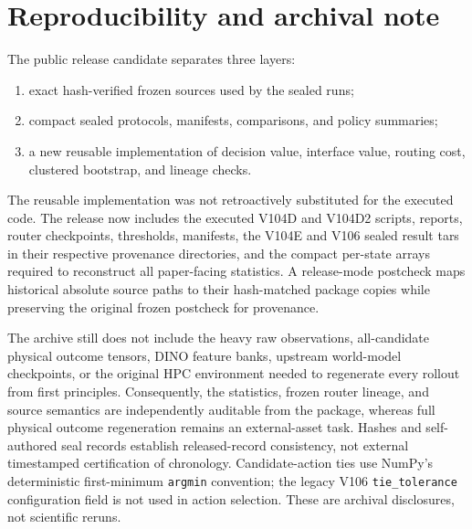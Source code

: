 \documentclass[10pt]{article}
\theoremstyle{definition}
\theoremstyle{remark}
\begin{document}
\section{Reproducibility and archival note}

The public release candidate separates three layers:
\begin{enumerate}
  \item exact hash-verified frozen sources used by the sealed runs;
  \item compact sealed protocols, manifests, comparisons, and policy summaries;
  \item a new reusable implementation of decision value, interface value,
  routing cost, clustered bootstrap, and lineage checks.
\end{enumerate}
The reusable implementation was not retroactively substituted for the
executed code.  The release now includes the executed V104D and V104D2 scripts,
reports, router checkpoints, thresholds, manifests, the V104E and V106 sealed
result tars in their respective provenance directories, and the compact
per-state arrays required to reconstruct all paper-facing statistics.  A release-mode postcheck maps historical absolute source paths to
their hash-matched package copies while preserving the original frozen
postcheck for provenance.

The archive still does not include the heavy raw observations, all-candidate
physical outcome tensors, DINO feature banks, upstream world-model checkpoints,
or the original HPC environment needed to regenerate every rollout from first
principles.  Consequently, the statistics, frozen router lineage, and source
semantics are independently auditable from the package, whereas full physical
outcome regeneration remains an external-asset task.  Hashes and self-authored
seal records establish released-record consistency, not external timestamped
certification of chronology.  Candidate-action ties use NumPy's deterministic
first-minimum \texttt{argmin} convention; the legacy V106
\texttt{tie\_tolerance} configuration field is not used in action selection.
These are archival disclosures, not scientific reruns.

\begingroup
\small
\sloppy
\setlength{\bibsep}{1.5pt}


\endgroup
\end{document}
